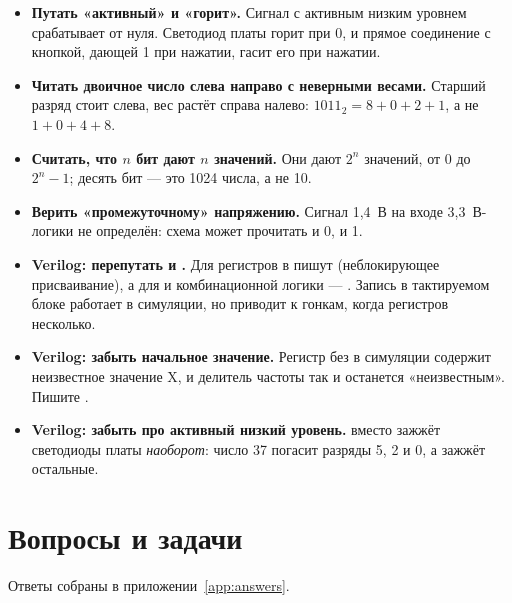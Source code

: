 \begin{warnbox}
\begin{itemize}
  \item \textbf{Путать «активный» и «горит».} Сигнал с активным низким уровнем
    срабатывает от нуля. Светодиод платы горит при 0, и прямое соединение с
    кнопкой, дающей 1 при нажатии, гасит его при нажатии.
  \item \textbf{Читать двоичное число слева направо с неверными весами.}
    Старший разряд стоит слева, вес растёт справа налево: $1011_2 = 8+0+2+1$,
    а не $1+0+4+8$.
  \item \textbf{Считать, что $n$ бит дают $n$ значений.} Они дают $2^n$
    значений, от $0$ до $2^n-1$; десять бит --- это 1024 числа, а не 10.
  \item \textbf{Верить «промежуточному» напряжению.} Сигнал 1,4~В на входе
    3,3~В-логики не определён: схема может прочитать и 0, и 1.
  \item \textbf{Verilog: перепутать \code{=} и \code{<=}.} Для регистров в
     пишут \code{<=} (неблокирующее присваивание), а
    для  и комбинационной логики --- \code{=}. Запись
     в тактируемом блоке работает в симуляции, но
    приводит к гонкам, когда регистров несколько.
  \item \textbf{Verilog: забыть начальное значение.} Регистр  без
     в симуляции содержит неизвестное значение X, и делитель частоты
    так и останется «неизвестным». Пишите .
  \item \textbf{Verilog: забыть про активный низкий уровень.}  вместо  зажжёт светодиоды платы
    \emph{наоборот}: число 37 погасит разряды 5, 2 и 0, а зажжёт остальные.
\end{itemize}
\end{warnbox}

\section{Вопросы и задачи}
\label{sec:tasks-signals}

Ответы собраны в приложении~\ref{app:answers}.


